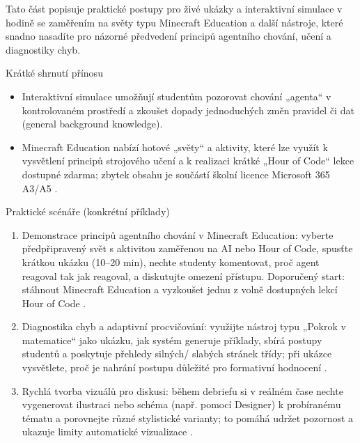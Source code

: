 \documentclass{report}%
\begin{document}
%
Tato část popisuje praktické postupy pro živé ukázky a interaktivní simulace v hodině se zaměřením na světy typu Minecraft Education a další nástroje, které snadno nasadíte pro názorné předvedení principů agentního chování, učení a diagnostiky chyb.

Krátké shrnutí přínosu
\begin{itemize}
  \item Interaktivní simulace umožňují studentům pozorovat chování „agenta“ v kontrolovaném prostředí a zkoušet dopady jednoduchých změn pravidel či dat (general background knowledge).
  \item Minecraft Education nabízí hotové „světy“ a aktivity, které lze využít k vysvětlení principů strojového učení a k realizaci krátké „Hour of Code“ lekce dostupné zdarma; zbytek obsahu je součástí školní licence Microsoft 365 A3/A5 \cite{kb_ai_101_tipu_pdf_04e4a115_page_15_2}.
\end{itemize}

Praktické scénáře (konkrétní příklady)
\begin{enumerate}
  \item Demonstrace principů agentního chování v Minecraft Education: vyberte předpřipravený svět s aktivitou zaměřenou na AI nebo Hour of Code, spusťte krátkou ukázku (10--20 min), nechte studenty komentovat, proč agent reagoval tak jak reagoval, a diskutujte omezení přístupu. Doporučený start: stáhnout Minecraft Education a vyzkoušet jednu z volně dostupných lekcí Hour of Code \cite{kb_ai_101_tipu_pdf_04e4a115_page_15_2}.
  \item Diagnostika chyb a adaptivní procvičování: využijte nástroj typu „Pokrok v matematice“ jako ukázku, jak systém generuje příklady, sbírá postupy studentů a poskytuje přehledy silných/ slabých stránek třídy; při ukázce vysvětlete, proč je nahrání postupu důležité pro formativní hodnocení \cite{kb_ai_101_tipu_pdf_04e4a115_page_8_1}.
  \item Rychlá tvorba vizuálů pro diskusi: během debriefu si v reálném čase nechte vygenerovat ilustraci nebo schéma (např. pomocí Designer) k probíranému tématu a porovnejte různé stylistické varianty; to pomáhá udržet pozornost a ukazuje limity automatické vizualizace \cite{kb_ai_101_tipu_pdf_04e4a115_page_51_1}.
\end{enumerate}
\end{document}
